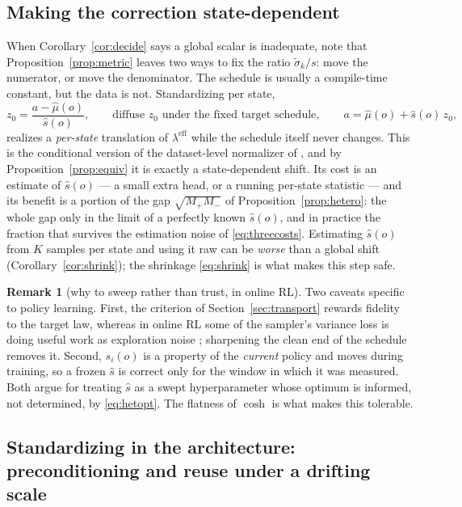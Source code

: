 \documentclass[11pt]{article}
\theoremstyle{definition}
\newtheorem{remark}[proposition]{Remark}
\newcommand{\sig}{\tilde\sigma}
\newcommand{\leff}{\lambda^{\mathrm{eff}}}
\begin{document}
\subsection{Making the correction state-dependent}
\label{sec:perstate}

When Corollary~\ref{cor:decide} says a global scalar is inadequate, note that
Proposition~\ref{prop:metric} leaves two ways to fix the ratio $\sig_k/s$: move
the numerator, or move the denominator. The schedule is usually a compile-time
constant, but the data is not. Standardizing per state,
\begin{equation}
  z_0=\frac{a-\hat\mu(o)}{\hat s(o)},
  \qquad\text{diffuse } z_0 \text{ under the fixed target schedule},
  \qquad a=\hat\mu(o)+\hat s(o)\,z_0,
  \label{eq:perstate}
\end{equation}
realizes a \emph{per-state} translation of $\leff$ while the schedule itself
never changes. This is the conditional version of the dataset-level normalizer of
\cite{chi2023diffusion}, and by Proposition~\ref{prop:equiv} it is exactly a
state-dependent shift. Its cost is an estimate of $\hat s(o)$ --- a small extra
head, or a running per-state statistic --- and its benefit is a portion of the
gap $\sqrt{M_+M_-}$ of Proposition~\ref{prop:hetero}: the whole gap only in the
limit of a perfectly known $\hat s(o)$, and in practice the fraction that
survives the estimation noise of \eqref{eq:threecosts}. Estimating $\hat s(o)$
from $K$ samples per state and using it raw can be \emph{worse} than a global
shift (Corollary~\ref{cor:shrink}); the shrinkage \eqref{eq:shrink} is what makes
this step safe.

\begin{remark}[why to sweep rather than trust, in online RL]
Two caveats specific to policy learning. First, the criterion of
Section~\ref{sec:transport} rewards fidelity to the target law, whereas in online
RL some of the sampler's variance loss is doing useful work as exploration noise
\cite{ren2024dppo}; sharpening the clean end of the schedule removes it. Second,
$s_i(o)$ is a property of the \emph{current} policy and moves during training, so
a frozen $\hat s$ is correct only for the window in which it was measured. Both
argue for treating $\hat s$ as a swept hyperparameter whose optimum is informed,
not determined, by \eqref{eq:hetopt}. The flatness of $\cosh$ is what makes this
tolerable.
\end{remark}

\subsection{Standardizing in the architecture: preconditioning and reuse under a drifting scale}
\label{sec:precond}
\end{document}
